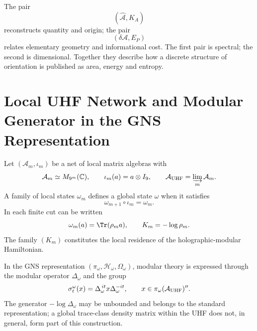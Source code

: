 The pair
\begin{equation}
 \left(
 \widehat{\mathcal A},K_A
 \right)
 \label{eq:rm-info-area-K-pair}
\end{equation}
reconstructs quantity and origin; the pair
\begin{equation}
 \left(
 \delta\mathcal A,E_P
 \right)
 \label{eq:rm-info-area-energy-pair}
\end{equation}
relates elementary geometry and informational cost. The first pair is
spectral; the second is dimensional. Together they describe how a discrete
structure of orientation is published as area, energy and entropy.

\section{Local UHF Network and Modular Generator in the GNS Representation}

Let \((\mathcal A_m,\iota_m)\) be a net of local matrix algebras
with
\begin{equation}
 \mathcal A_m\simeq M_{9^m}(\mathbb C),
 \qquad
 \iota_m(a)=a\otimes I_9,
 \qquad
 \mathcal A_{\rm UHF}=\varinjlim_m\mathcal A_m.
 \label{eq:rm-info-uhf-net}
\end{equation}
A family of local states \(\omega_m\) defines a global state
\(\omega\) when it satisfies
\begin{equation}
 \omega_{m+1}\circ\iota_m=\omega_m.
 \label{eq:rm-info-state-compatibility}
\end{equation}
In each finite cut can be written
\begin{equation}
 \omega_m(a)=\Tr(\rho_m a),
 \qquad
 K_m=-\log\rho_m.
 \label{eq:rm-info-local-densities}
\end{equation}
The family \((K_m)\) constitutes the local residence of the
holographic-modular Hamiltonian.

In the GNS representation
\((\pi_\omega,\mathcal H_\omega,\Omega_\omega)\), modular theory is
expressed through the modular operator \(\Delta_\omega\) and the group
\begin{equation}
 \sigma_t^\omega(x)
 =\Delta_\omega^{\,it}x\Delta_\omega^{-it},
 \qquad
 x\in\pi_\omega(\mathcal A_{\rm UHF})''.
 \label{eq:rm-info-gns-modular-flow}
\end{equation}
The generator \(-\log\Delta_\omega\) may be unbounded and belongs to the
standard representation; a global trace-class density matrix within
the UHF does not, in general, form part of this construction.

